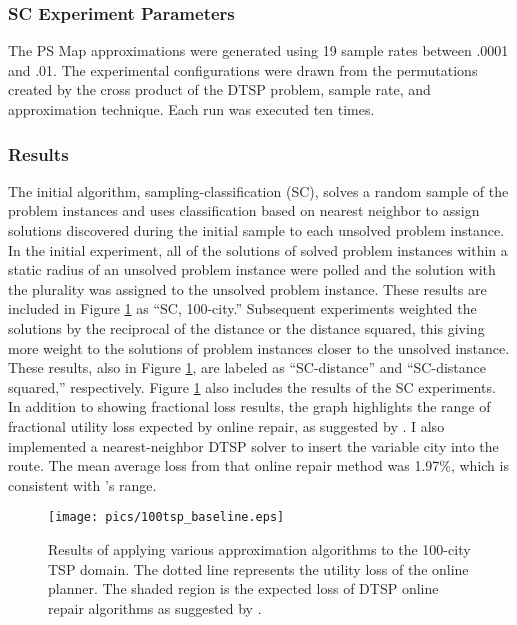 \subsubsection{SC Experiment Parameters} The PS Map approximations were generated using 19 sample rates between .0001 and .01.  The experimental configurations were drawn from the permutations created by the cross product of the DTSP problem, sample rate, and approximation technique.  Each run was executed ten times.


\subsubsection{Results}  The initial algorithm, sampling-classification (SC), solves a random sample of the problem instances and uses classification based on nearest neighbor to assign solutions discovered during the initial sample to each unsolved problem instance.  In the initial experiment, all of the solutions of solved problem instances within a static radius of an unsolved problem instance  were polled and the solution with the plurality was assigned to the unsolved problem instance.  These results are included in Figure \ref{fig:100tsp_baseline} as ``SC, 100-city.''  Subsequent experiments weighted the solutions by the reciprocal of the distance or the distance squared, this giving more weight to the solutions of problem instances closer to  the unsolved instance.  These results, also in Figure \ref{fig:100tsp_baseline}, are labeled as ``SC-distance'' and ``SC-distance squared,'' respectively.  Figure \ref{fig:100tsp_baseline} also includes the  results of the SC experiments.  In addition to showing fractional loss results, the graph highlights the range of fractional utility loss expected by online repair, as suggested by \cite{larsen2000dvrp}.  I also implemented a nearest-neighbor DTSP solver to insert the variable city into the route.  The mean average loss from that online repair method was 1.97\%, which is consistent with \citeauthor{larsen2000dvrp}'s range.

\begin{figure}
\begin{center}
\texttt{[image: pics/100tsp\_baseline.eps]}
\caption{Results of applying various approximation algorithms to the 100-city TSP domain.  The dotted line represents the utility loss of the online planner.  The shaded region is the expected loss of DTSP online repair algorithms as suggested by \cite{larsen2000dvrp}.}
\label{fig:100tsp_baseline}
\end{center}
\end{figure}

